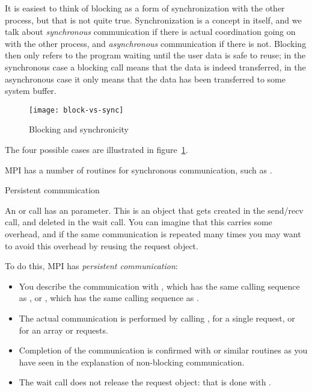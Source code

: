 
It is easiest to think of blocking as a form of synchronization with
the other process, but that is not quite true. Synchronization is a
concept in itself, and we talk about \emph{synchronous} communication
if there is actual coordination going on with the other process,
and \emph{asynchronous} communication if there is not. Blocking then
only refers to the program waiting until the user data is safe
to reuse; in the synchronous case a blocking call means that the data
is indeed transferred, in the asynchronous case it only means that the
data has been transferred to some system buffer.
%
\begin{figure}[ht]
\texttt{[image: block-vs-sync]}
\caption{Blocking and synchronicity}
\label{fig:block-sync}
\end{figure}
The four possible cases are illustrated in figure~\ref{fig:block-sync}.

MPI has a number of routines for synchronous communication,
such as .



 {Persistent communication}
\label{sec:persistent}

An  or  call has an  parameter.
%
%
This
is an object that gets created in the send/recv call, and deleted in
the wait call. You can imagine that this carries some overhead, and if
the same communication is repeated many times you may want to avoid
this overhead by reusing the request object.

To do this, MPI has \emph{persistent communication}:
\begin{itemize}
\item You describe the communication with
  , which has the same calling sequence as
  , or , which has the same
  calling sequence as .
\item The actual communication is performed by calling
  , for a single request, or
   for an array or requests.
\item Completion of the communication is confirmed with
   or similar routines as you have seen in the
  explanation of non-blocking communication.
\item The wait call does not release the request object: that is done
  with .
\end{itemize}

